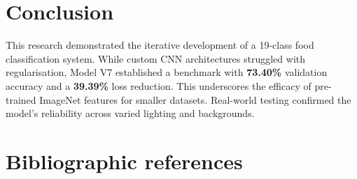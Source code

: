 \documentclass[a4paper,11pt]{article}
\begin{document}
\section{Conclusion}

This research demonstrated the iterative development of a 19-class food classification system. While custom CNN architectures struggled with regularisation, Model V7 established a benchmark with \textbf{73.40\%} validation accuracy and a \textbf{39.39\%} loss reduction. This underscores the efficacy of pre-trained ImageNet features for smaller datasets. Real-world testing confirmed the model's reliability across varied lighting and backgrounds.
\section{Bibliographic references} 




\end{document}

